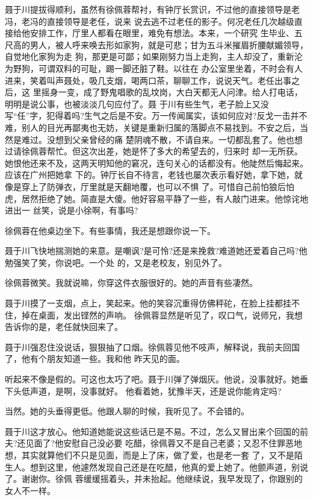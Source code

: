 \documentclass[11pt,a4paper,onecolumn]{article}
\begin{document}
聂于川提拔得顺利，虽然有徐佩蓉帮衬，有钟厅长赏识，不过他的直接领导是老冯，老冯的直接领导是老任，说来
说去逃不过老任的影子。何况老任几次越级直接给他安排工作，厅里人都看在眼里，难免有想法。本来，一个研究
生毕业、五尺高的男人，被人呼来唤去形如家狗，就是可悲；甘为五斗米摧眉折腰献媚领导，自觉地化家狗为走
狗，那更是可鄙；如果刚努力当上走狗，主人却没了，重新沦为野狗，可谓双料的可耻，踢一脚还脏了鞋。以往在
办公室里坐着，不时会有人进来，笑着叫声聂处，吸几支烟，喝两口茶，聊聊工作，说说天气。老任出事之后，这
里摇身一变，成了野鬼唱歌的乱坟岗，大白天都无人问津。给人打电话，明明是说公事，也被淡淡几句应付了。聂
于川有些生气，老子脸上又没写“任”字，犯得着吗?生气之后是不安。万一传闻属实，该如何应对?反戈一击并不
难，别人的目光再鄙夷也无妨，关键是重新归属的落脚点不易找到。不安之后，当然是难过。没想到父亲曾经的痛
楚阴魂不散，不请自来。一切都乱套了。他也想过请徐佩蓉帮忙。但这次出差，她是怀了多大的希望去的，归来时
却一无所获。她恨他还来不及，这两天明知他的窘况，连句关心的话都没有。他陡然后悔起来。应该在广州把她拿
下的。钟厅长自不待言，老钱也屡次表示看好她，拿下她，就像是穿上了防弹衣，厅里就是天翻地覆，也可以不惧
了。可惜自己前怕狼后怕虎，居然拒绝了她。简直是大傻。他好容易平静了一些，有人敲门进来。他惊诧地进出一
丝笑，说是小徐啊，有事吗?

徐佩蓉在他桌边坐下。有些事情，我还是想跟你说一下。

聂于川飞快地揣测她的来意。是嘲讽?是可怜?还是来挽救?难道她还爱着自己吗?他勉强笑了笑，你说吧。一个处
的，又是老校友，别见外了。

徐佩蓉微笑。我就说嘛，你穿这件衣服很好的。她的声音有些凄然。

聂于川摸了一支烟，点上，笑起来。他的笑容沉重得仿佛秤砣，在脸上挂都挂不住，掉在桌面，发出铿然的声响。
徐佩蓉显然是听见了，叹口气，说师兄，我想告诉你的是，老任就快回来了。

聂于川强忍住没说话，狠狠抽了口烟。徐佩蓉见他不吱声，解释说，我前夫回国了，他有个朋友知道一些。我和他
昨天见的面。

听起来不像是假的。可这也太巧了吧。聂于川弹了弹烟灰。他说，没事就好。她垂下头低声道，是啊，没事就好。
他看着她，犹豫半天，还是说你能肯定吗?

当然。她的头垂得更低。他跟人聊的时候，我听见了。不会错的。

聂于川这才放心。他知道她能说这些话已是不易。不过，怎么又冒出来个回国的前夫?还见面了?他安慰自己没必要
吃醋，徐佩蓉又不是自己老婆；又忍不住罪恶地想，其实就算他们不只是见面，而是上了床，做了爱，也是老一套
了，又不是陌生人。想到这里，他遽然发现自己还是在吃醋，他真的爱上她了。他颤声道，别说了。谢谢你。徐佩
蓉缓缓摇着头，并未抬起。他继续说，我早发现了，你跟别的女人不一样。
\end{document}
